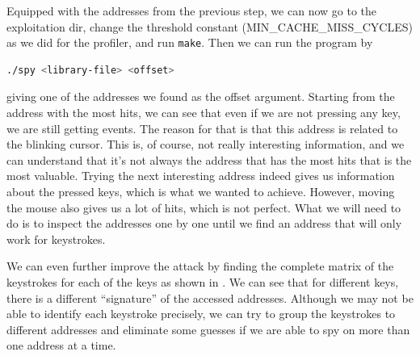 Equipped with the addresses from the previous step, we can now go to the exploitation dir, change the threshold constant (MIN\_CACHE\_MISS\_CYCLES) as we did for the profiler, and run \texttt{make}. Then we can run the program by 
\begin{lstlisting}[language=bash]
./spy <library-file> <offset>
\end{lstlisting}
giving one of the addresses we found as the offset argument. Starting from the address with the most hits, we can see that even if we are not pressing any key, we are still getting events. The reason for that is that this address is related to the blinking cursor. This is, of course, not really interesting information, and we can understand that it's not always the address that has the most hits that is the most valuable. Trying the next interesting address indeed gives us information about the pressed keys, which is what we wanted to achieve. However, moving the mouse also gives us a lot of hits, which is not perfect. What we will need to do is to inspect the addresses one by one until we find an address that will only work for keystrokes.

We can even further improve the attack by finding the complete matrix of the keystrokes for each of the keys as shown in . We can see that for different keys, there is a different “signature” of the accessed addresses. Although we may not be able to identify each keystroke precisely, we can try to group the keystrokes to different addresses and eliminate some guesses if we are able to spy on more than one address at a time.


